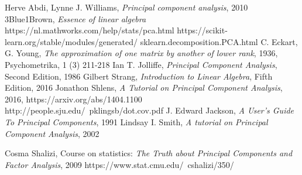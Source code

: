 \documentclass[10pt,twocolumn]{article}
\begin{document}





\thebibliography{}

 Herve Abdi, Lynne J. Williams, \textit{Principal component analysis}, 2010
 3Blue1Brown, \textit{Essence of linear algebra}
 https://nl.mathworks.com/help/stats/pca.html
 https://scikit-learn.org/stable/modules/generated/
sklearn.decomposition.PCA.html
 C. Eckart, G. Young, \textit{The approximation of one matrix by another of lower rank}, 1936, Psychometrika, 1 (3) 211-218
 Ian T. Jolliffe, \textit{Principal Component Analysis}, Second Edition, 1986
 Gilbert Strang, \textit{Introduction to Linear Algebra}, Fifth Edition, 2016
 Jonathon Shlens, \textit{A Tutorial on Principal Component Analysis}, 2016, https://arxiv.org/abs/1404.1100
 http://people.sju.edu/~pklingsb/dot.cov.pdf
 J. Edward Jackson, \textit{A User's Guide To Principal Components}, 1991
 Lindsay I. Smith, \textit{A tutorial on Principal Component Analysis}, 2002

 Cosma Shalizi, Course on statistics: \textit{The Truth about Principal Components and Factor Analysis}, 2009 https://www.stat.cmu.edu/~cshalizi/350/
\end{document}
